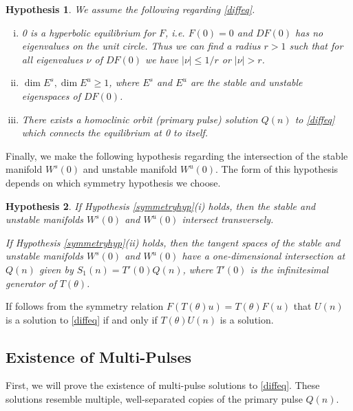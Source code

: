 \documentclass[12pt]{article}
\newtheorem{hypothesis}{Hypothesis}
\begin{document}
\begin{hypothesis}\label{initialhyp}
We assume the following regarding \eqref{diffeq}.
\begin{enumerate}[(i)]
\item 0 is a hyperbolic equilibrium for $F$, i.e. $F(0) = 0$ and $DF(0)$ has no eigenvalues on the unit circle. Thus we can find a radius $r > 1$ such that for all eigenvalues $\nu$ of $DF(0)$ we have $|\nu| \leq 1/r$ or $|\nu| > r$.
\item $\dim E^s, \dim E^u \geq 1$, where $E^s$ and $E^u$ are the stable and unstable eigenspaces of $DF(0)$.
\item There exists a homoclinic orbit (primary pulse) solution $Q(n)$ to \eqref{diffeq} which connects the equilibrium at 0 to itself.
\end{enumerate}
\end{hypothesis}

Finally, we make the following hypothesis regarding the intersection of the stable manifold $W^s(0)$ and unstable manifold $W^u(0)$. The form of this hypothesis depends on which symmetry hypothesis we choose.

\begin{hypothesis}\label{intersectionhyp}
If Hypothesis \ref{symmetryhyp}(i) holds, then the stable and unstable manifolds $W^s(0)$ and $W^u(0)$ intersect transversely.

If Hypothesis \ref{symmetryhyp}(ii) holds, then the tangent spaces of the stable and unstable manifolds $W^s(0)$ and $W^u(0)$ have a one-dimensional intersection at $Q(n)$ given by $S_1(n) = T'(0) Q(n)$, where $T'(0)$ is the infinitesimal generator of $T(\theta)$.
\end{hypothesis}

If follows from the symmetry relation $F(T(\theta)u) = T(\theta)F(u)$ that $U(n)$ is a solution to \eqref{diffeq} if and only if $T(\theta)U(n)$ is a solution. 

\subsection{Existence of Multi-Pulses}

First, we will prove the existence of multi-pulse solutions to \eqref{diffeq}. These solutions resemble multiple, well-separated copies of the primary pulse $Q(n)$.
\end{document}
